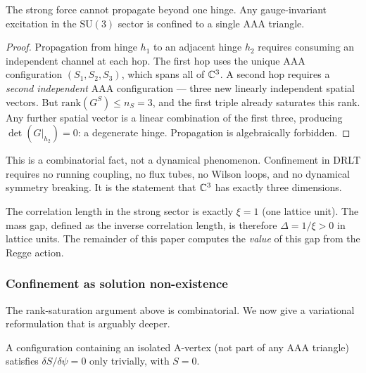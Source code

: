 \begin{proposition}[Confinement]
\label{prop:confinement}
The strong force cannot propagate beyond one hinge. Any gauge-invariant
excitation in the $\mathrm{SU}(3)$ sector is confined to a single AAA
triangle.
\end{proposition}

\begin{proof}
Propagation from hinge $h_1$ to an adjacent hinge $h_2$ requires
consuming an independent channel at each hop. The first hop uses the
unique AAA configuration $(S_1, S_2, S_3)$, which spans all of
$\mathbb{C}^3$. A second hop requires a \emph{second independent} AAA
configuration --- three new linearly independent spatial vectors. But
$\mathrm{rank}(G^S) \leq n_S = 3$, and the first triple already
saturates this rank. Any further spatial vector is a linear combination
of the first three, producing $\det(G|_{h_2}) = 0$: a degenerate hinge.
Propagation is algebraically forbidden.
\end{proof}

\begin{remark}
This is a combinatorial fact, not a dynamical phenomenon. Confinement
in DRLT requires no running coupling, no flux tubes, no Wilson loops,
and no dynamical symmetry breaking. It is the statement that
$\mathbb{C}^3$ has exactly three dimensions.
\end{remark}

\begin{remark}
The correlation length in the strong sector is exactly $\xi = 1$ (one
lattice unit). The mass gap, defined as the inverse correlation length,
is therefore $\Delta = 1/\xi > 0$ in lattice units. The remainder of
this paper computes the \emph{value} of this gap from the Regge action.
\end{remark}

\subsubsection{Confinement as solution non-existence}
\label{sec:confinement_solution}

The rank-saturation argument above is combinatorial.  We now give a variational reformulation that is arguably deeper.

\begin{theorem}
\label{thm:confinement_variational}
A configuration containing an isolated A-vertex (not part of any AAA triangle) satisfies $\delta S/\delta\psi = 0$ only trivially, with $S = 0$.
\end{theorem}

